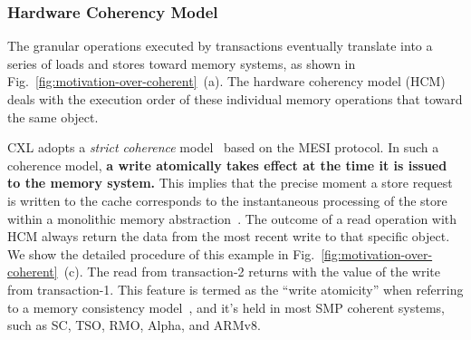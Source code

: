 \subsubsection{Hardware Coherency Model}

The granular operations executed by transactions eventually translate into a series of loads and stores toward memory systems, as shown in Fig.~\ref{fig:motivation-over-coherent}~(a). The hardware coherency model (HCM) deals with the execution order of these individual memory operations that toward the same object. 



CXL adopts a \textit{strict coherence} model~\cite{munin_ppopp90, rtm_isca14} based on the MESI protocol. In such a coherence model, \textbf{a write atomically takes effect at the time it is issued to the memory system.} This implies that the precise moment a store request is written to the cache corresponds to the instantaneous processing of the store within a monolithic memory abstraction~\cite{rvweak_isca18, spandex_asplos18}. The outcome of a read operation with HCM always return the data from the most recent write to that specific object. We show the detailed procedure of this example in Fig.~\ref{fig:motivation-over-coherent}~(c). The read from transaction-2 returns with the value of the write from transaction-1. This feature is termed as the ``write atomicity'' when referring to a memory consistency model~\cite{rvweak_pact17, armcm_cmb12, powercm_pldi11, rvweak_isca18, in-memory-transactions}, and it's held in most SMP coherent systems, such as SC, TSO, RMO, Alpha, and ARMv8. 


